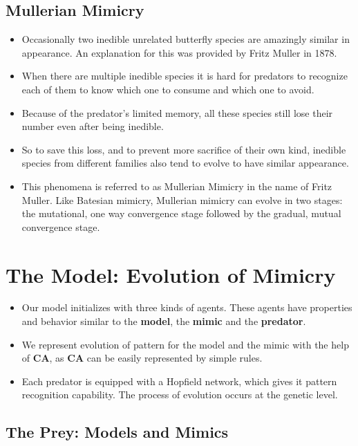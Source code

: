 \documentclass[a0,landscape]{a0poster}
\begin{document}
\begin{multicols}{5}
\color{DarkSlateGray}
\subsection*{Mullerian Mimicry}
\begin{itemize}
	\item Occasionally two inedible unrelated butterfly species are amazingly similar in appearance. An explanation for this was provided by Fritz Muller in 1878. 
	\item When there are multiple inedible species it is hard for predators to recognize each of them to know which one to consume and which one to avoid.
	\item Because of the predator's limited memory, all these species still lose their number even after being inedible. 
	\item So to save this loss, and to prevent more sacrifice of their own kind, inedible species from different families also tend to evolve to have similar appearance. 
	\item This phenomena is referred to as Mullerian Mimicry in the name of Fritz Muller. Like Batesian mimicry, Mullerian mimicry can evolve in two stages: the mutational, one way convergence stage followed by the gradual, mutual convergence stage.
\end{itemize}

\color{SaddleBrown} 
\section*{The Model: Evolution of Mimicry}

\begin{itemize}
	\item Our model initializes with three kinds of agents. These agents have properties and behavior similar to the \textbf{model}, the \textbf{mimic} and the \textbf{predator}.
	\item We represent evolution of pattern for the model and the mimic with the help of \textbf{CA}, as \textbf{CA} can be easily represented by simple rules.
	\item Each predator is equipped with a Hopfield network, which gives it pattern recognition capability. The process of evolution occurs at the genetic level.
\end{itemize}

\color{DarkSlateGray}
\subsection*{The Prey: Models and Mimics}


\end{multicols}
\end{document}
